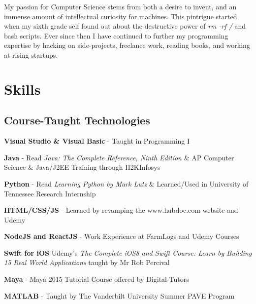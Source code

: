 \documentclass[letterpaper]{deedy-resume} %
\begin{document}
\begin{minipage}[t]{0.66\textwidth} %


My passion for Computer Science stems from both a desire to invent,
and an immense amount of intellectual curiosity for machines. This
pintrigue started when my sixth grade self found
out about the destructive power of {\it rm -rf /} and bash scripts.
Ever since then I have continued to further my programming
expertise by hacking on side-projects, freelance work,
reading books, and working at rising startups.
  


\section{Skills}

\subsection{Course-Taught Technologies}

\vspace{\topsep} %

\begin{tightitemize}

    \item \textbf{Visual Studio \& Visual Basic} - Taught in Programming I
    \item \textbf{Java} - Read \textit{Java: The Complete Reference, Ninth Edition} \& AP Computer Science \& Java/J2EE Training through H2KInfosys
    \item \textbf{Python} - Read \textit{Learning Python by Mark Lutz} \& Learned/Used in University of Tennessee Research Internship
    \item \textbf{HTML/CSS/JS} - Learned by revamping the www.hubdoc.com website and Udemy
    \item \textbf{NodeJS and ReactJS} - Work Experience at FarmLogs and Udemy Courses
    \item \textbf{Swift for iOS} Udemy's \textit{The Complete iOS8 and Swift Course: Learn by Building 15 Real World Applications} taught by Mr Rob Percival
    \item \textbf{Maya} - Maya 2015 Tutorial Course offered by Digital-Tutors
    \item \textbf{MATLAB} - Taught by The Vanderbilt University Summer PAVE Program
    

\end{tightitemize}
\end{minipage}
\end{document}
